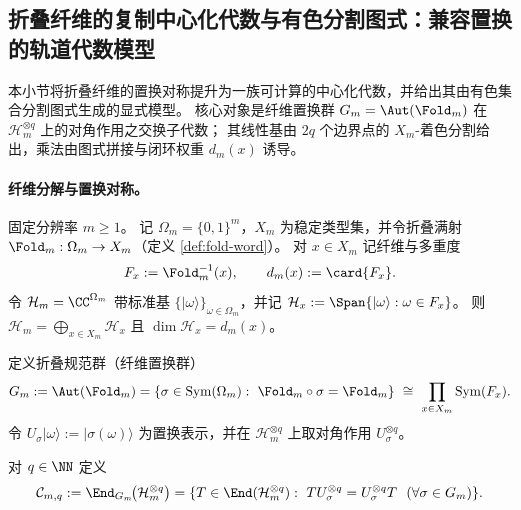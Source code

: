\subsection{折叠纤维的复制中心化代数与有色分割图式：兼容置换的轨道代数模型}\label{subsec:op-algebra-fold-replication-centralizer}
本小节将折叠纤维的置换对称提升为一族可计算的中心化代数，并给出其由有色集合分割图式生成的显式模型。
核心对象是纤维置换群 \(G_m=\Aut(\Fold_m)\) 在 \(\mathcal H_m^{\otimes q}\) 上的对角作用之交换子代数；
其线性基由 \(2q\) 个边界点的 \(X_m\)-着色分割给出，乘法由图式拼接与闭环权重 \(d_m(x)\) 诱导。

\providecommand{\ket}[1]{\lvert #1\rangle}
\providecommand{\bra}[1]{\langle #1\rvert}

\paragraph{纤维分解与置换对称。}
固定分辨率 \(m\ge 1\)。
记 \(\Omega_m=\{0,1\}^m\)，\(X_m\) 为稳定类型集，并令折叠满射 \(\Fold_m:\Omega_m\to X_m\)（定义 \ref{def:fold-word}）。
对 \(x\in X_m\) 记纤维与多重度
\[
F_x:=\Fold_m^{-1}(x),\qquad d_m(x):=\card{F_x}.
\]
令 \(\mathcal H_m=\CC^{\Omega_m}\) 带标准基 \(\{\ket{\omega}\}_{\omega\in\Omega_m}\)，并记 \(\mathcal H_x:=\Span\{\ket{\omega}:\omega\in F_x\}\)。
则 \(\mathcal H_m=\bigoplus_{x\in X_m}\mathcal H_x\) 且 \(\dim\mathcal H_x=d_m(x)\)。
\par
定义折叠规范群（纤维置换群）
\[
G_m:=\Aut(\Fold_m)=\{\sigma\in\mathrm{Sym}(\Omega_m):\ \Fold_m\circ\sigma=\Fold_m\}
\ \cong\ \prod_{x\in X_m}\mathrm{Sym}(F_x).
\]
令 \(U_\sigma\ket{\omega}:=\ket{\sigma(\omega)}\) 为置换表示，并在 \(\mathcal H_m^{\otimes q}\) 上取对角作用 \(U_\sigma^{\otimes q}\)。

\begin{definition}[复制中心化代数]\label{def:op-algebra-replication-centralizer}
对 \(q\in\NN\) 定义
\[
\mathcal{C}_{m,q}:=\End_{G_m}\!\bigl(\mathcal{H}_m^{\otimes q}\bigr)
=\{T\in\End(\mathcal H_m^{\otimes q}):\ TU_\sigma^{\otimes q}=U_\sigma^{\otimes q}T\ \ (\forall\sigma\in G_m)\}.
\]
\end{definition}

